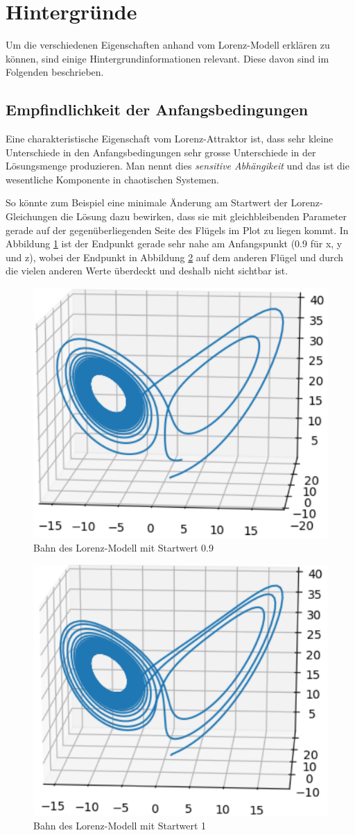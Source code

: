 
\section{Hintergründe}
Um die verschiedenen Eigenschaften anhand vom Lorenz-Modell erklären zu können, sind einige Hintergrundinformationen relevant. Diese davon sind im Folgenden beschrieben.

\subsection{Empfindlichkeit der Anfangsbedingungen}
Eine charakteristische Eigenschaft vom Lorenz-Attraktor ist, dass sehr kleine Unterschiede in den Anfangsbedingungen sehr grosse Unterschiede in der Lösungsmenge produzieren. Man nennt dies \textit{sensitive Abhängikeit} und das ist die wesentliche Komponente in chaotischen Systemen. 

So könnte zum Beispiel eine minimale Änderung am Startwert der Lorenz-Gleichungen die Lösung dazu bewirken, dass sie mit gleichbleibenden Parameter gerade auf der gegenüberliegenden Seite des Flügels im Plot zu liegen kommt. In Abbildung \ref{fig:lorenz-0} ist der Endpunkt gerade sehr nahe am Anfangspunkt (0.9 für x, y und z), wobei der Endpunkt in Abbildung \ref{fig:lorenz-1} auf dem anderen Flügel und durch die vielen anderen Werte überdeckt und deshalb nicht sichtbar ist. 

\begin{figure}
\centering
\includegraphics[width=0.5\linewidth]{lorenz/assets/lorenz-modell/lorenz09}
\caption{Bahn des Lorenz-Modell mit Startwert 0.9}
\label{fig:lorenz-0}
\end{figure}
\begin{figure}
\centering
\includegraphics[width=0.5\linewidth]{lorenz/assets/lorenz-modell/lorenz10}
\caption{Bahn des Lorenz-Modell mit Startwert 1}
\label{fig:lorenz-1}
\end{figure}


